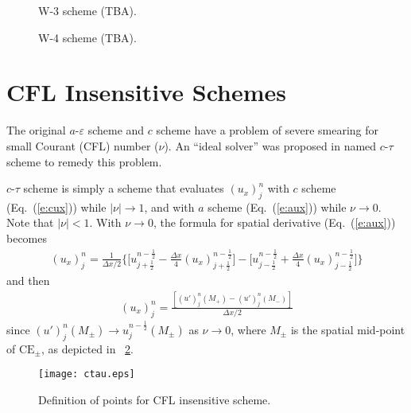 \documentclass{turgon}
\begin{document}
\begin{figure}[htbp]
  \centering
  \caption{W-3 scheme (TBA).}
  \label{f:W-3}
  \caption{W-4 scheme (TBA).}
  \label{f:W-4}
\end{figure}

\section{CFL Insensitive Schemes}
\label{s:ctau}

The original $a$-$\varepsilon$ scheme and $c$ scheme have a problem of severe
smearing for small Courant (CFL) number ($\nu$).  An ``ideal solver'' was
proposed in \citep{chang_multi-dimensional_2003} named $c$-$\tau$ scheme to
remedy this problem.

$c$-$\tau$ scheme is simply a scheme that evaluates $(u_x)_j^n$ with $c$ scheme
(Eq.~(\ref{e:cux})) while $|\nu|\rightarrow1$, and with $a$ scheme
(Eq.~(\ref{e:aux})) while $\nu\rightarrow0$.  Note that $|\nu|<1$.  With
$\nu\rightarrow0$, the formula for spatial derivative (Eq.~(\ref{e:aux}))
becomes
\begin{align*}
  (u_x)_j^n = \frac{1}{\Delta x/2}\Big\{
      \Big[ u_{j+\frac{1}{2}}^{n-\frac{1}{2}}
         - \frac{\Delta x}{4}(u_x)_{j+\frac{1}{2}}^{n-\frac{1}{2}}
      \Big]
    - \Big[ u_{j-\frac{1}{2}}^{n-\frac{1}{2}}
         + \frac{\Delta x}{4}(u_x)_{j-\frac{1}{2}}^{n-\frac{1}{2}}
      \Big]
  \Big\}
\end{align*}
and then
\begin{align*}
  (u_x)_j^n =
  \frac{\left[(u')_j^n(M_+) - (u')_j^n(M_-)\right]}{\Delta x/2}
\end{align*}
since $(u')_j^n(M_{\pm}) \rightarrow u_j^{n-\frac{1}{2}}(M_{\pm})$ as
$\nu\rightarrow0$, where $M_{\pm}$ is the spatial mid-point of
$\mathrm{CE}_{\pm}$, as depicted in \figurename~\ref{f:ctau}.

\begin{figure}[htbp]
  \centering
  \texttt{[image: ctau.eps]}
  \caption{Definition of points for CFL insensitive scheme.}
  \label{f:ctau}
\end{figure}
\end{document}
